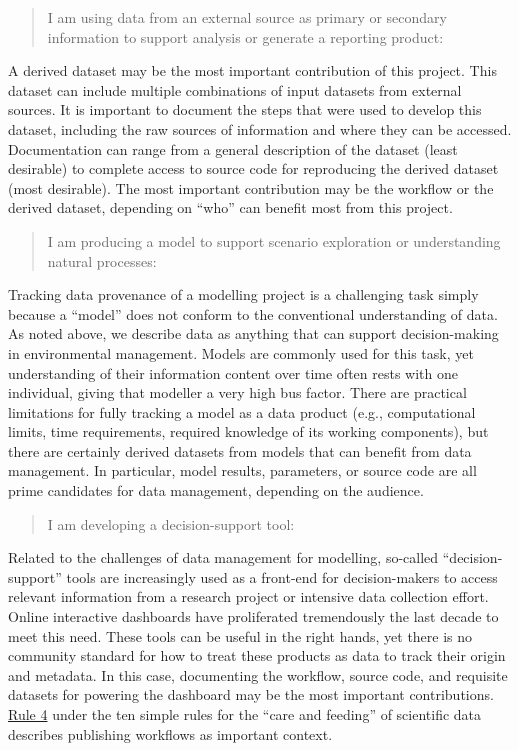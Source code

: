 \documentclass[
]{book}
\begin{document}
\begin{quote}
I am using data from an external source as primary or secondary information to support analysis or generate a reporting product:
\end{quote}

A derived dataset may be the most important contribution of this project. This dataset can include multiple combinations of input datasets from external sources. It is important to document the steps that were used to develop this dataset, including the raw sources of information and where they can be accessed. Documentation can range from a general description of the dataset (least desirable) to complete access to source code for reproducing the derived dataset (most desirable). The most important contribution may be the workflow or the derived dataset, depending on ``who'' can benefit most from this project.

\begin{quote}
I am producing a model to support scenario exploration or understanding natural processes:
\end{quote}

Tracking data provenance of a modelling project is a challenging task simply because a ``model'' does not conform to the conventional understanding of data. As noted above, we describe data as anything that can support decision-making in environmental management. Models are commonly used for this task, yet understanding of their information content over time often rests with one individual, giving that modeller a very high bus factor. There are practical limitations for fully tracking a model as a data product (e.g., computational limits, time requirements, required knowledge of its working components), but there are certainly derived datasets from models that can benefit from data management. In particular, model results, parameters, or source code are all prime candidates for data management, depending on the audience.

\begin{quote}
I am developing a decision-support tool:
\end{quote}

Related to the challenges of data management for modelling, so-called ``decision-support'' tools are increasingly used as a front-end for decision-makers to access relevant information from a research project or intensive data collection effort. Online interactive dashboards have proliferated tremendously the last decade to meet this need. These tools can be useful in the right hands, yet there is no community standard for how to treat these products as data to track their origin and metadata. In this case, documenting the workflow, source code, and requisite datasets for powering the dashboard may be the most important contributions. \href{https://journals.plos.org/ploscompbiol/article?id=10.1371/journal.pcbi.1003542\#s4}{Rule 4} under the ten simple rules for the ``care and feeding'' of scientific data \citep{Goodman14} describes publishing workflows as important context.
\end{document}
